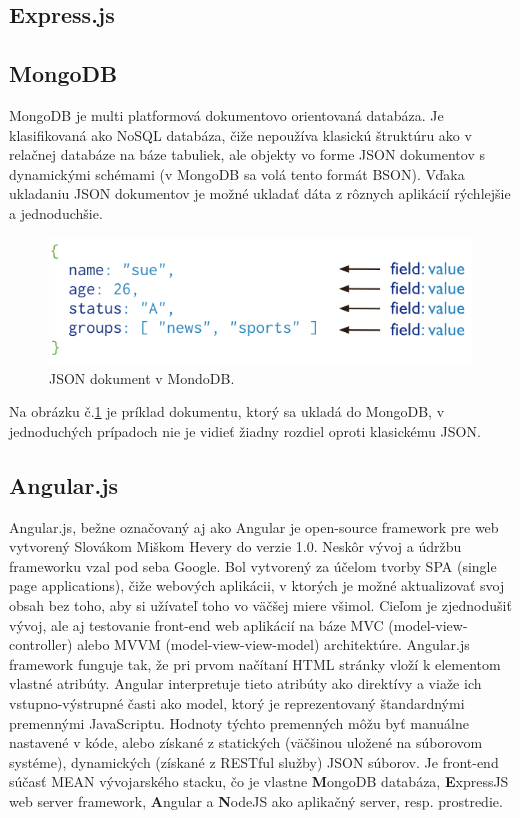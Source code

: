 \subsection{Express.js}

\subsection{MongoDB}
MongoDB je multi platformová dokumentovo orientovaná databáza. Je klasifikovaná ako NoSQL databáza, čiže nepoužíva klasickú štruktúru ako v relačnej databáze na báze tabuliek, ale objekty vo forme JSON dokumentov s dynamickými schémami (v MongoDB sa volá tento formát BSON). Vďaka ukladaniu JSON dokumentov je možné ukladať dáta z rôznych aplikácií rýchlejšie a jednoduchšie.\cite{mongodb-wiki}

\begin{figure}[H]
  \centering
  \includegraphics[scale=0.7]{img/mongodb/crud-annotated-document.png}
  \caption{JSON dokument v MondoDB.}
  \label{mongodb-example}
\end{figure}

Na obrázku č.\ref{mongodb-example} je príklad dokumentu, ktorý sa ukladá do MongoDB, v jednoduchých prípadoch nie je vidieť žiadny rozdiel oproti klasickému JSON.

\subsection{Angular.js}
Angular.js, bežne označovaný aj ako Angular je open-source framework pre web vytvorený Slovákom Miškom Hevery do verzie 1.0. Neskôr vývoj a údržbu frameworku vzal pod seba Google. Bol vytvorený za účelom tvorby SPA (single page applications), čiže webových aplikácii, v ktorých je možné aktualizovať svoj obsah bez toho, aby si užívateľ toho vo väčšej miere všimol. Cieľom je zjednodušiť vývoj, ale aj testovanie front-end web aplikácií na báze MVC (model-view-controller) alebo MVVM (model-view-view-model) architektúre.
Angular.js framework funguje tak, že pri prvom načítaní HTML stránky vloží k elementom vlastné atribúty. Angular interpretuje tieto atribúty ako direktívy a viaže ich vstupno-výstrupné časti ako model, ktorý je reprezentovaný štandardnými premennými JavaScriptu. Hodnoty týchto premenných môžu byť manuálne nastavené v kóde, alebo získané z statických (väčšinou uložené na súborovom systéme), dynamických (získané z RESTful služby) JSON súborov.
Je front-end súčasť MEAN vývojarského stacku, čo je vlastne \textbf{M}ongoDB databáza, \textbf{E}xpressJS web server framework, \textbf{A}ngular  a \textbf{N}odeJS ako aplikačný server, resp. prostredie.\cite{angular-wiki}\cite{angular-docs}

